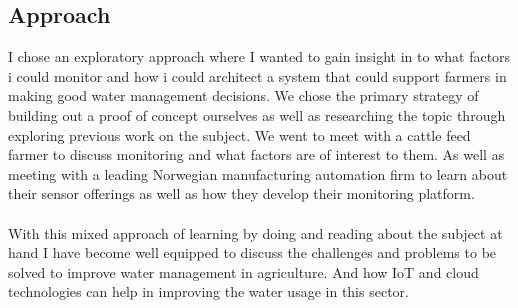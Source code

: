 \documentclass[]{uiophd}
\begin{document}
\subsection{Approach}
I chose an exploratory approach where I wanted to gain insight in to what factors i could monitor and how i could architect a system that could support farmers in making good water management decisions. We chose the primary strategy of building out a proof of concept ourselves as well as researching the topic through exploring previous work on the subject. We went to meet with a cattle feed farmer to discuss monitoring and what factors are of interest to them. As well as meeting with a leading Norwegian manufacturing automation firm to learn about their sensor offerings as well as how they develop their monitoring platform.
\\\\
With this mixed approach of learning by doing and reading about the subject at hand I have become well equipped to discuss the challenges and problems to be solved to improve water management in agriculture. And how IoT and cloud technologies can help in improving the water usage in this sector.
\\\\
\end{document}
